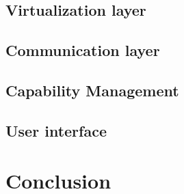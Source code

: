 \subsection{Virtualization layer}
\doit

\subsection{Communication layer}
\doit

\subsection{Capability Management}
\doit

\subsection{User interface}
\doit

\section{Conclusion}
\doit




